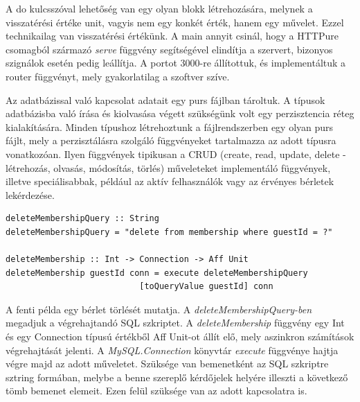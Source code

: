 \documentclass[12pt]{article}
\begin{document}
A do kulcsszóval lehetőség van egy olyan blokk létrehozására, melynek a visszatérési értéke unit, vagyis nem egy konkét érték, hanem egy művelet. Ezzel technikailag van visszatérési értékünk.  A main annyit csinál, hogy a HTTPure csomagból származó  \textit{serve} függvény segítségével elindítja a szervert, bizonyos szignálok esetén pedig leállítja. A portot 3000-re állítottuk, és implementáltuk a router függvényt, mely gyakorlatilag a szoftver szíve.

Az adatbázissal való kapcsolat adatait egy purs fájlban tároltuk. A típusok adatbázisba való írása és kiolvasása végett szükségünk volt egy perzisztencia réteg kialakítására. Minden típushoz létrehoztunk a fájlrendszerben egy olyan purs fájlt, mely a perzisztálásra szolgáló függvényeket tartalmazza az adott típusra vonatkozóan. Ilyen függvények tipikusan a CRUD (create, read, update, delete - létrehozás, olvasás, módosítás, törlés) műveleteket implementáló függvények, illetve speciálisabbak, például az aktív felhasználók vagy az érvényes bérletek lekérdezése.

\begin{verbatim}
deleteMembershipQuery :: String
deleteMembershipQuery = "delete from membership where guestId = ?"

deleteMembership :: Int -> Connection -> Aff Unit
deleteMembership guestId conn = execute deleteMembershipQuery
                           [toQueryValue guestId] conn
\end{verbatim}
A fenti példa egy bérlet törlését mutatja.  A \textit{deleteMembershipQuery-ben} megadjuk a végrehajtandó SQL szkriptet. 
 A \textit{deleteMembership} függvény egy Int és egy Connection típusú értékből Aff Unit-ot állít elő, mely aszinkron számítások végrehajtását jelenti.  A \textit{MySQL.Connection} könyvtár \textit{execute} függvénye hajtja végre majd az adott műveletet. Szüksége van bemenetként az SQL szkriptre sztring formában, melybe a benne szereplő kérdőjelek helyére illeszti a következő tömb bemenet elemeit. Ezen felül szüksége van az adott kapcsolatra is.
\end{document}
